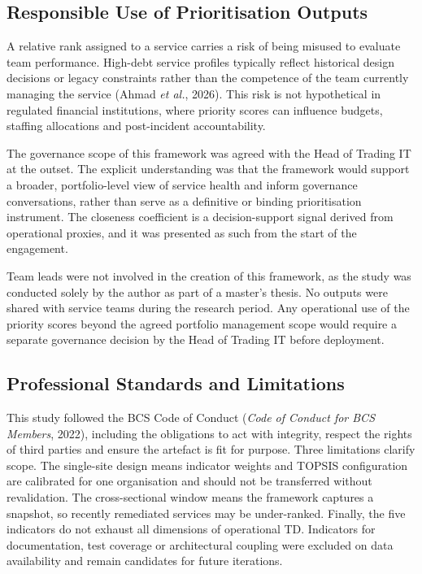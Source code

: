 \documentclass[
  12pt,
  letterpaper,
  12pt,
  oneside,
  english,
  onehalfspacing,
  headsepline]{MastersDoctoralThesis}
\begin{document}
\subsection{Responsible Use of Prioritisation
Outputs}\label{responsible-use-of-prioritisation-outputs}

A relative rank assigned to a service carries a risk of being misused to
evaluate team performance. High-debt service profiles typically reflect
historical design decisions or legacy constraints rather than the
competence of the team currently managing the service (Ahmad \emph{et
al.}, 2026). This risk is not hypothetical in regulated financial
institutions, where priority scores can influence budgets, staffing
allocations and post-incident accountability.

The governance scope of this framework was agreed with the Head of
Trading IT at the outset. The explicit understanding was that the
framework would support a broader, portfolio-level view of service
health and inform governance conversations, rather than serve as a
definitive or binding prioritisation instrument. The closeness
coefficient is a decision-support signal derived from operational
proxies, and it was presented as such from the start of the engagement.

Team leads were not involved in the creation of this framework, as the
study was conducted solely by the author as part of a master's thesis.
No outputs were shared with service teams during the research period.
Any operational use of the priority scores beyond the agreed portfolio
management scope would require a separate governance decision by the
Head of Trading IT before deployment.

\subsection{Professional Standards and
Limitations}\label{professional-standards-and-limitations}

This study followed the BCS Code of Conduct (\emph{Code of {Conduct} for
{BCS Members}}, 2022), including the obligations to act with integrity,
respect the rights of third parties and ensure the artefact is fit for
purpose. Three limitations clarify scope. The single-site design means
indicator weights and TOPSIS configuration are calibrated for one
organisation and should not be transferred without revalidation. The
cross-sectional window means the framework captures a snapshot, so
recently remediated services may be under-ranked. Finally, the five
indicators do not exhaust all dimensions of operational TD. Indicators
for documentation, test coverage or architectural coupling were excluded
on data availability and remain candidates for future iterations.
\end{document}
